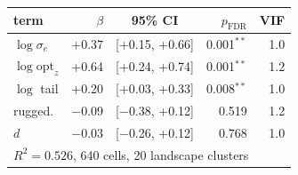 \begin{tabular}{lrcrr}
\toprule
term & $\beta$ & 95\% CI & $p_{\mathrm{FDR}}$ & VIF \\
\midrule
$\log\sigma_e$ & +0.37 & [+0.15, +0.66] & 0.001$^{**}$ & 1.0 \\
$\log\mathrm{opt}_z$ & +0.64 & [+0.24, +0.74] & 0.001$^{**}$ & 1.2 \\
$\log$ tail & +0.20 & [+0.03, +0.33] & 0.008$^{**}$ & 1.0 \\
rugged. & $-$0.09 & [$-$0.38, +0.12] & 0.519 & 1.2 \\
$d$ & $-$0.03 & [$-$0.26, +0.12] & 0.768 & 1.0 \\
\midrule
\multicolumn{5}{l}{$R^2 = 0.526$, 640 cells, 20 landscape clusters} \\
\bottomrule
\end{tabular}
